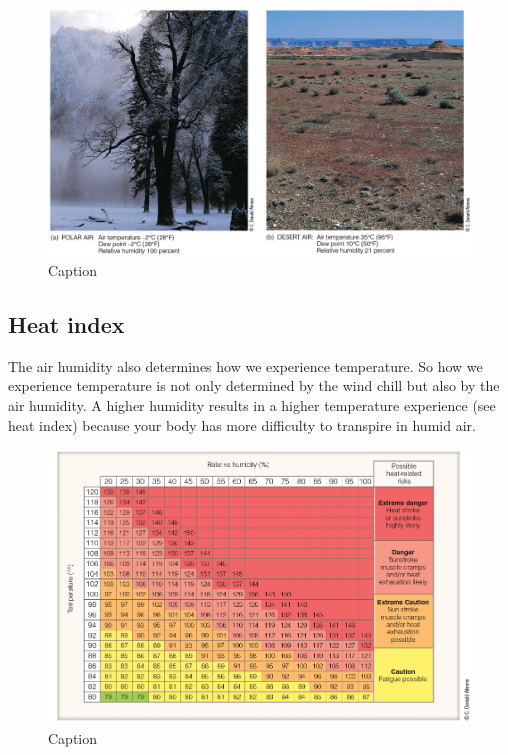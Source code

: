 \documentclass[12pt,oneside]{book}
\begin{document}
\begin{figure}

{\centering \includegraphics[width=1\linewidth]{figures/Figure236} 

}

\caption{Caption}\label{fig:dewpoint2}
\end{figure}

\subsection{Heat index}\label{heat-index}

The air humidity also determines how we experience temperature. So how
we experience temperature is not only determined by the wind chill but
also by the air humidity. A higher humidity results in a higher
temperature experience (see heat index) because your body has more
difficulty to transpire in humid air.

\begin{figure}

{\centering \includegraphics[width=1\linewidth]{figures/Figure237} 

}

\caption{Caption}\label{fig:HI}
\end{figure}
\end{document}
